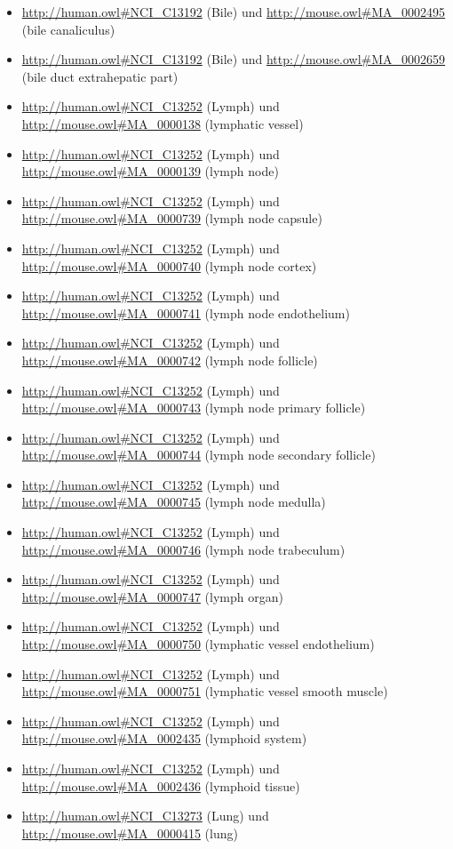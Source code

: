 \begin{itemize}
	\item \url{http://human.owl#NCI_C13192} (Bile) und \url{http://mouse.owl#MA_0002495} (bile canaliculus)
	\item \url{http://human.owl#NCI_C13192} (Bile) und \url{http://mouse.owl#MA_0002659} (bile duct extrahepatic part)
	\item \url{http://human.owl#NCI_C13252} (Lymph) und \url{http://mouse.owl#MA_0000138} (lymphatic vessel)
	\item \url{http://human.owl#NCI_C13252} (Lymph) und \url{http://mouse.owl#MA_0000139} (lymph node)
	\item \url{http://human.owl#NCI_C13252} (Lymph) und \url{http://mouse.owl#MA_0000739} (lymph node capsule)
	\item \url{http://human.owl#NCI_C13252} (Lymph) und \url{http://mouse.owl#MA_0000740} (lymph node cortex)
	\item \url{http://human.owl#NCI_C13252} (Lymph) und \url{http://mouse.owl#MA_0000741} (lymph node endothelium)
	\item \url{http://human.owl#NCI_C13252} (Lymph) und \url{http://mouse.owl#MA_0000742} (lymph node follicle)
	\item \url{http://human.owl#NCI_C13252} (Lymph) und \url{http://mouse.owl#MA_0000743} (lymph node primary follicle)
	\item \url{http://human.owl#NCI_C13252} (Lymph) und \url{http://mouse.owl#MA_0000744} (lymph node secondary follicle)
	\item \url{http://human.owl#NCI_C13252} (Lymph) und \url{http://mouse.owl#MA_0000745} (lymph node medulla)
	\item \url{http://human.owl#NCI_C13252} (Lymph) und \url{http://mouse.owl#MA_0000746} (lymph node trabeculum)
	\item \url{http://human.owl#NCI_C13252} (Lymph) und \url{http://mouse.owl#MA_0000747} (lymph organ)
	\item \url{http://human.owl#NCI_C13252} (Lymph) und \url{http://mouse.owl#MA_0000750} (lymphatic vessel endothelium)
	\item \url{http://human.owl#NCI_C13252} (Lymph) und \url{http://mouse.owl#MA_0000751} (lymphatic vessel smooth muscle)
	\item \url{http://human.owl#NCI_C13252} (Lymph) und \url{http://mouse.owl#MA_0002435} (lymphoid system)
	\item \url{http://human.owl#NCI_C13252} (Lymph) und \url{http://mouse.owl#MA_0002436} (lymphoid tissue)
	\item \url{http://human.owl#NCI_C13273} (Lung\textunderscoreSurfactant) und \url{http://mouse.owl#MA_0000415} (lung)

\end{itemize}
